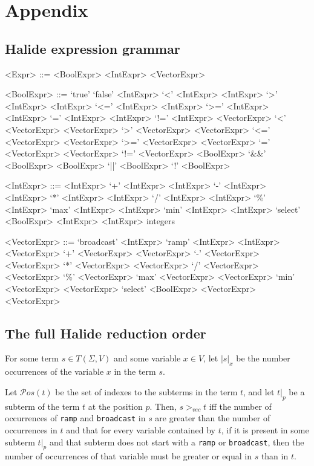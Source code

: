 \documentclass[sigplan,10pt,review,anonymous]{acmart}\settopmatter{printfolios=true,printccs=false,printacmref=false}
\begin{document}


\pagebreak
\appendix
\section{Appendix}

\subsection{Halide expression grammar}
\label{ss:appendixA}


\begin{grammar}
<Expr> ::= <BoolExpr> 
\alt <IntExpr> 
\alt <VectorExpr>

<BoolExpr> ::= `true'
\alt `false'
\alt <IntExpr> `<' <IntExpr>
\alt <IntExpr> `>' <IntExpr>
\alt <IntExpr> `<=' <IntExpr>
\alt <IntExpr> `>=' <IntExpr>
\alt <IntExpr> `=' <IntExpr>
\alt <IntExpr> `!=' <IntExpr>
\alt <VectorExpr> `<' <VectorExpr>
\alt <VectorExpr> `>' <VectorExpr>
\alt <VectorExpr> `<=' <VectorExpr>
\alt <VectorExpr> `>=' <VectorExpr>
\alt <VectorExpr> `=' <VectorExpr>
\alt <VectorExpr> `!=' <VectorExpr>
\alt <BoolExpr> `&&' <BoolExpr>
\alt <BoolExpr> `||' <BoolExpr>
\alt `!' <BoolExpr>

<IntExpr> ::= <IntExpr> `+' <IntExpr>
\alt <IntExpr> `-' <IntExpr>
\alt <IntExpr> `*' <IntExpr>
\alt <IntExpr> `/' <IntExpr>
\alt <IntExpr> `\%' <IntExpr>
\alt `max' <IntExpr> <IntExpr>
\alt `min' <IntExpr> <IntExpr>
\alt `select' <BoolExpr> <IntExpr> <IntExpr>
\alt integers

<VectorExpr> ::= `broadcast' <IntExpr>
\alt `ramp' <IntExpr> <IntExpr>
\alt <VectorExpr> `+' <VectorExpr>
\alt <VectorExpr> `-' <VectorExpr>
\alt <VectorExpr> `*' <VectorExpr>
\alt <VectorExpr> `/' <VectorExpr>
\alt <VectorExpr> `\%' <VectorExpr>
\alt `max' <VectorExpr> <VectorExpr>
\alt `min' <VectorExpr> <VectorExpr>
\alt `select' <BoolExpr> <VectorExpr> <VectorExpr>
\end{grammar}

\subsection{The full Halide reduction order}
\label{a:reductionorder}

For some term $s \in T(\Sigma, V)$ and some variable $x \in V$, let $|s|_x$ be the number occurrences of the variable $x$ in the term $s$.

Let $\mathcal{P}os(t)$ be the set of indexes to the subterms in the term $t$, and let $t|_p$ be a subterm of the term $t$ at the position $p$. Then, $s >_{vec} t$ iff the number of occurrences of \texttt{ramp} and \texttt{broadcast} in $s$ are greater than the number of occurrences in $t$ and that for every variable contained by $t$, if it is present in some subterm $t|_p$ and that subterm does not start with a \texttt{ramp} or \texttt{broadcast}, then the number of occurrences of that variable must be greater or equal in $s$ than in $t$.
\end{document}
